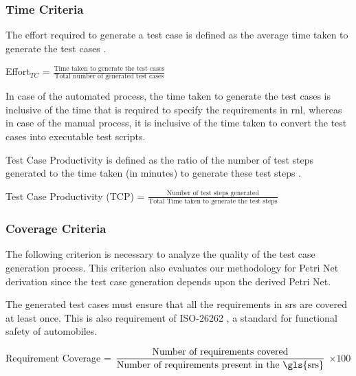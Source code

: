 \subsubsection{\textbf{Time Criteria}} 

\begin{definition}
\label{def:def5}

The effort required to generate a test case is defined as the average time taken to generate the test cases \cite{elghondakly2015waterfall}.

Effort$_{TC}$   = $\displaystyle\frac{\mbox{Time taken to generate the test cases}}{\mbox{Total number of generated test cases}}$

In case of the automated process, the time taken to generate the test cases is inclusive of the time that is required to specify the requirements in \gls{rnl}, whereas in case of the manual process, it is inclusive of the time taken to convert the test cases into executable test scripts.
\end{definition}

\begin{definition}
\label{def:def6}

Test Case Productivity is defined as the ratio of the number of test steps generated to the time taken (in minutes) to generate these test steps \cite{gulechha2009software}.

Test Case Productivity (TCP)   = $\displaystyle\frac{\mbox{Number of test steps generated}}{\mbox{Total Time taken to generate the test steps}}$
\end{definition}

\subsubsection{\textbf{Coverage Criteria}}
The following criterion is necessary to analyze the quality of the test case generation process. This criterion also evaluates our methodology for Petri Net derivation since the test case generation depends upon the derived Petri Net.

\begin{definition}
\label{def:def7}

The generated test cases must ensure that all the requirements in \gls{srs} are covered at least once. This is also requirement of ISO-26262 \cite{iso201126262}, a standard for functional safety of automobiles.

Requirement Coverage = $\displaystyle\frac{\mbox{Number of requirements covered}}{\mbox{Number of requirements present in the \gls{srs}}}$  $\times 100$
\end{definition}

